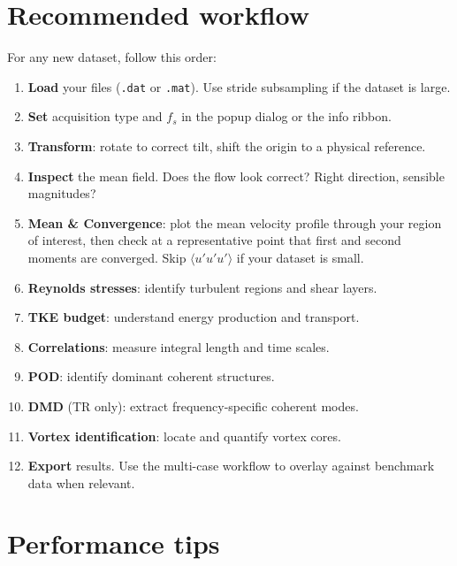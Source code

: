 \documentclass[11pt, a4paper]{report}
\begin{document}
\section{Recommended workflow}

For any new dataset, follow this order:

\begin{enumerate}[leftmargin=1.5em]
  \item \textbf{Load} your files (\texttt{.dat} or \texttt{.mat}). Use stride subsampling if the dataset is large.
  \item \textbf{Set} acquisition type and $f_s$ in the popup dialog or the info ribbon.
  \item \textbf{Transform}: rotate to correct tilt, shift the origin to a physical reference.
  \item \textbf{Inspect} the mean field. Does the flow look correct? Right direction, sensible magnitudes?
  \item \textbf{Mean \& Convergence}: plot the mean velocity profile through your region of interest, then check at a representative point that first and second moments are converged. Skip $\langle u'u'u' \rangle$ if your dataset is small.
  \item \textbf{Reynolds stresses}: identify turbulent regions and shear layers.
  \item \textbf{TKE budget}: understand energy production and transport.
  \item \textbf{Correlations}: measure integral length and time scales.
  \item \textbf{POD}: identify dominant coherent structures.
  \item \textbf{DMD} (TR only): extract frequency-specific coherent modes.
  \item \textbf{Vortex identification}: locate and quantify vortex cores.
  \item \textbf{Export} results. Use the multi-case workflow to overlay against benchmark data when relevant.
\end{enumerate}

\section{Performance tips}
\end{document}
